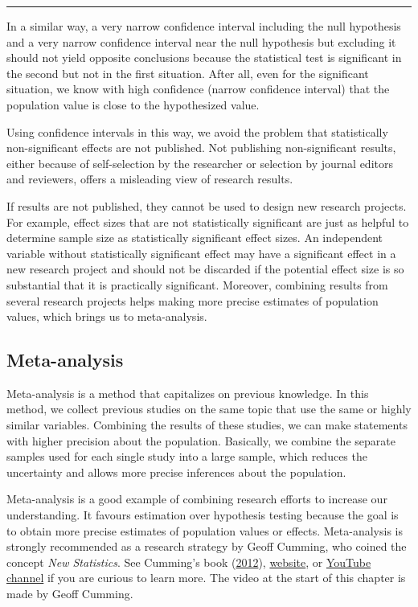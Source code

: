 \documentclass[a4paper]{book}
\theoremstyle{definition}
\theoremstyle{definition}
\theoremstyle{definition}
\theoremstyle{remark}
\begin{document}
\begin{center}\rule{0.5\linewidth}{\linethickness}\end{center}

In a similar way, a very narrow confidence interval including the null
hypothesis and a very narrow confidence interval near the null
hypothesis but excluding it should not yield opposite conclusions
because the statistical test is significant in the second but not in the
first situation. After all, even for the significant situation, we know
with high confidence (narrow confidence interval) that the population
value is close to the hypothesized value.

Using confidence intervals in this way, we avoid the problem that
statistically non-significant effects are not published. Not publishing
non-significant results, either because of self-selection by the
researcher or selection by journal editors and reviewers, offers a
misleading view of research results.

If results are not published, they cannot be used to design new research
projects. For example, effect sizes that are not statistically
significant are just as helpful to determine sample size as
statistically significant effect sizes. An independent variable without
statistically significant effect may have a significant effect in a new
research project and should not be discarded if the potential effect
size is so substantial that it is practically significant. Moreover,
combining results from several research projects helps making more
precise estimates of population values, which brings us to
meta-analysis.

\subsection{Meta-analysis}\label{meta-analysis}

Meta-analysis is a method that capitalizes on previous knowledge. In
this method, we collect previous studies on the same topic that use the
same or highly similar variables. Combining the results of these
studies, we can make statements with higher precision about the
population. Basically, we combine the separate samples used for each
single study into a large sample, which reduces the uncertainty and
allows more precise inferences about the population.

Meta-analysis is a good example of combining research efforts to
increase our understanding. It favours estimation over hypothesis
testing because the goal is to obtain more precise estimates of
population values or effects. Meta-analysis is strongly recommended as a
research strategy by Geoff Cumming, who coined the concept \emph{New
Statistics}. See Cumming's book
(\protect\hyperlink{ref-RefWorks:3883}{2012}),
\href{http://www.latrobe.edu.au/psychology/research/research-areas/cognitive-and-developmental-psychology/esci}{website},
or \href{https://www.youtube.com/user/geoffdcumming}{YouTube channel} if
you are curious to learn more. The video at the start of this chapter is
made by Geoff Cumming.
\end{document}
